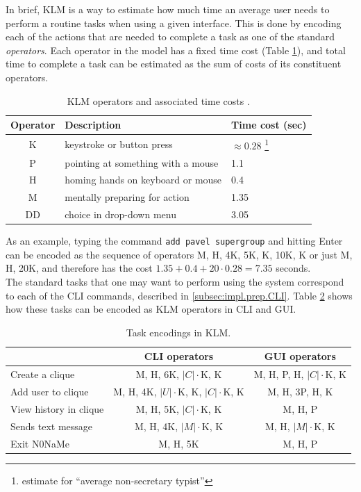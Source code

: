 \documentclass[a4paper, 12pt]{report}
\newcommand{\funkytt}{\fontfamily{AnonymousPro}\selectfont}
\begin{document}
In brief, KLM is a way to estimate how much time an average user needs to perform a routine tasks when using a given interface. This is done by encoding each of the actions that are needed to complete a task as one of the standard \emph{operators}. Each operator in the model has a fixed time cost (Table \ref{tab:KLM}), and total time to complete a task can be estimated as the sum of costs of its constituent operators.

\begin{table}[H]
\centering
\begin{tabular*}{0.79\linewidth}{c | l | l}
Operator & Description & Time cost (sec) \\
\hline
K & keystroke or button press & $\approx 0.28$ \footnote{estimate for ``average non-secretary typist''} \\
P & pointing at something with a mouse & 1.1 \\
H & homing hands on keyboard or mouse & 0.4 \\
M & mentally preparing for action & 1.35 \\
DD & choice in drop-down menu & 3.05 \\
\end{tabular*}
\caption{\label{tab:KLM} KLM operators and associated time costs \cite{card1980keystroke}\cite{sauro2009estimating}.}
\end{table}

As an example, typing the command \texttt{add pavel supergroup} and hitting Enter can be encoded as the sequence of operators M, H, 4K, 5K, K, 10K, K or just M, H, 20K, and therefore has the cost $1.35 + 0.4 + 20 \cdot 0.28 = 7.35$ seconds. \\


The standard tasks that one may want to perform using the system correspond to each of the CLI commands, described in \cref{subsec:impl.prep.CLI}. Table \ref{tab:KLM_encode} shows how these tasks can be encoded as KLM operators in CLI and GUI.

\begin{table}[H]
\centering
\begin{tabular*}{1.0\linewidth}{l | c | c}
        & CLI operators & GUI operators \\
\hline
Create a clique & M, H, 6K,  $|C|\cdot$K, K & M, H, P, H,  $|C|\cdot$K, K\\
Add user to clique & M, H, 4K, $|U|\cdot$K, K, $|C|\cdot$K, K & M, H, 3P, H, K \\
View history in clique & M, H, 5K, $|C|\cdot$K, K & M, H, P \\
Sends text message & M, H, 4K, $|M|\cdot$K, K & M, H, $|M|\cdot$K, K \\
Exit {\funkytt N0NaMe} & M, H, 5K & M, H, P \\
\end{tabular*}
\caption{\label{tab:KLM_encode} Task encodings in KLM.}
\end{table}
\end{document}
